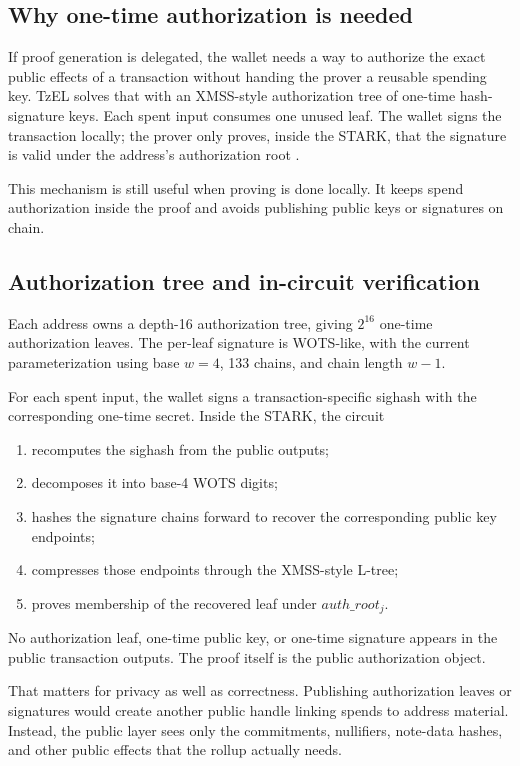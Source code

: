 \documentclass[11pt]{article}
\newcommand{\TzEL}{TzEL}
\begin{document}
\subsection{Why one-time authorization is needed}

If proof generation is delegated, the wallet needs a way to authorize the exact
public effects of a transaction without handing the prover a reusable spending
key. \TzEL{} solves that with an XMSS-style authorization tree of one-time
hash-signature keys. Each spent input consumes one unused leaf. The wallet
signs the transaction locally; the prover only proves, inside the STARK, that
the signature is valid under the address's authorization root
\cite{rfc8391,xmss,wotsplus}.

This mechanism is still useful when proving is done locally. It keeps spend
authorization inside the proof and avoids publishing public keys or signatures
on chain.

\subsection{Authorization tree and in-circuit verification}

Each address owns a depth-16 authorization tree, giving \(2^{16}\) one-time
authorization leaves. The per-leaf signature is WOTS-like, with the current
parameterization using base \(w = 4\), 133 chains, and chain length \(w - 1\).

For each spent input, the wallet signs a transaction-specific sighash with the
corresponding one-time secret. Inside the STARK, the circuit

\begin{enumerate}
  \item recomputes the sighash from the public outputs;
  \item decomposes it into base-4 WOTS digits;
  \item hashes the signature chains forward to recover the corresponding public
        key endpoints;
  \item compresses those endpoints through the XMSS-style L-tree;
  \item proves membership of the recovered leaf under \(auth\_root_j\).
\end{enumerate}

No authorization leaf, one-time public key, or one-time signature appears in the
public transaction outputs. The proof itself is the public authorization object.

That matters for privacy as well as correctness. Publishing authorization leaves
or signatures would create another public handle linking spends to address
material. Instead, the public layer sees only the commitments, nullifiers,
note-data hashes, and other public effects that the rollup actually needs.
\end{document}
